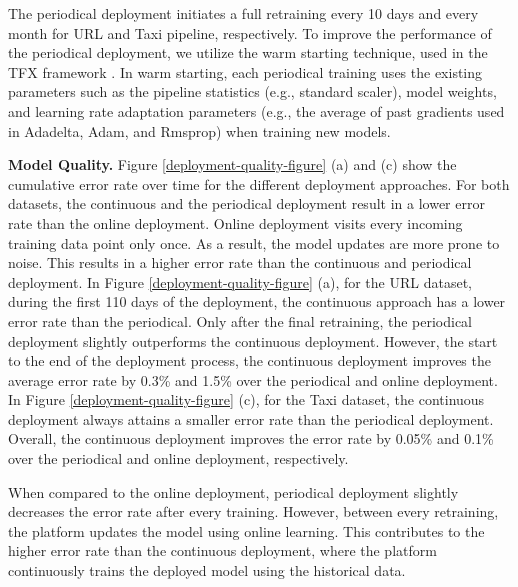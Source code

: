 The periodical deployment initiates a full retraining every 10 days and every month for URL and Taxi pipeline, respectively.
To improve the performance of the periodical deployment, we utilize the warm starting technique, used in the TFX framework \cite{baylor2017tfx}.
In warm starting, each periodical training uses the existing parameters such as the pipeline statistics (e.g., standard scaler), model weights, and learning rate adaptation parameters (e.g., the average of past gradients used in Adadelta, Adam, and Rmsprop) when training new models.

\textbf{Model Quality. }
Figure \ref{deployment-quality-figure} (a) and (c) show the cumulative error rate over time for the different deployment approaches.
For both datasets, the continuous and the periodical deployment result in a lower error rate than the online deployment.
Online deployment visits every incoming training data point only once.
As a result, the model updates are more prone to noise.
This results in a higher error rate than the continuous and periodical deployment.
In Figure \ref{deployment-quality-figure} (a), for the URL dataset, during the first 110 days of the deployment, the continuous approach has a lower error rate than the periodical.
Only after the final retraining, the periodical deployment slightly outperforms the continuous deployment.
However, the start to the end of the deployment process, the continuous deployment improves the average error rate by 0.3\% and 1.5\% over the periodical and online deployment.
In Figure \ref{deployment-quality-figure}  (c), for the Taxi dataset, the continuous deployment always attains a smaller error rate than the periodical deployment.
Overall, the continuous deployment improves the error rate by 0.05\% and  0.1\% over the periodical and online deployment, respectively.

When compared to the online deployment, periodical deployment slightly decreases the error rate after every training.
However, between every retraining, the platform updates the model using online learning.
This contributes to the higher error rate than the continuous deployment, where the platform continuously trains the deployed model using the historical data.

\begin{figure*}[t]
\centering
\resizebox{\textwidth}{!}{}
\caption{Model Quality and Training cost for different deployment approaches}
\label{deployment-quality-figure}
\end{figure*}

